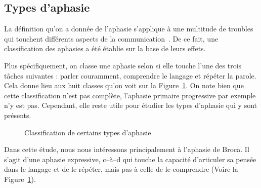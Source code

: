 \subsection{Types d'aphasie}

La définition qu'on a donnée de l'aphasie s'applique à une multitude de troubles  
qui touchent différents aspects de la communication~\cite[p. 135, 136]{Hallowell_2017}.
De ce fait, une classification des aphasies a été établie sur la base de leurs effets.

Plus spécifiquement, on classe une aphasie selon si elle touche l'une des trois tâches suivantes :
parler couramment, comprendre le langage et répéter la parole. 
Cela donne lieu aux huit classes qu'on voit sur la Figure~\ref{fig.aphasia-tree}.
On note  bien que cette classification n'est pas complète, l'aphasie primaire progressive par exemple n'y est pas.
Cependant, elle reste utile pour étudier les types d'aphasie qui y sont présents.


\begin{figure}[htb]
    \begin{center}
        \resizebox{\textwidth}{!}{}
    \end{center}
    \caption[Classification de certains types d'aphasie]
    {Classification de certains types d'aphasie~\cite{Sreedharan_2018}}
    \label{fig.aphasia-tree}
\end{figure}

Dans cette étude, nous nous intéressons principalement à l'aphasie de Broca.
Il s'agit d'une aphasie expressive, 
c--à--d qui touche la capacité d'articuler sa pensée dans le langage et de le répéter, 
mais pas à celle de le comprendre (Voire la Figure~\ref{fig.aphasia-tree}).